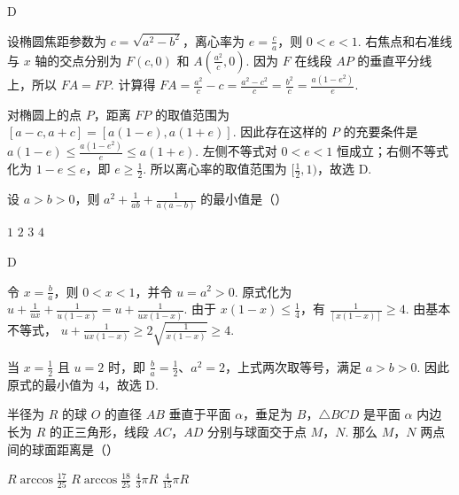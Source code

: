 \begin{answer}
D
\end{answer}

\begin{solution}
设椭圆焦距参数为 \(c=\sqrt{a^2-b^2}\)，离心率为 \(e=\frac{c}{a}\)，则 \(0<e<1\). 右焦点和右准线与 \(x\) 轴的交点分别为 \(F(c,0)\) 和 \(A(\frac{a^2}{c},0)\). 因为 \(F\) 在线段 \(AP\) 的垂直平分线上，所以 \(FA=FP\). 计算得
\(FA=\frac{a^2}{c}-c=\frac{a^2-c^2}{c}=\frac{b^2}{c}=\frac{a(1-e^2)}{e}\).

对椭圆上的点 \(P\)，距离 \(FP\) 的取值范围为 \([a-c,a+c]=[a(1-e),a(1+e)]\). 因此存在这样的 \(P\) 的充要条件是 \(a(1-e)\leq\frac{a(1-e^2)}{e}\leq a(1+e)\). 左侧不等式对 \(0<e<1\) 恒成立；右侧不等式化为 \(1-e\leq e\)，即 \(e\geq\frac{1}{2}\). 所以离心率的取值范围为 \([\frac{1}{2},1)\)，故选 D.
\end{solution}

\begin{problem}
设 \(a > b > 0\)，则 \(a^2 + \frac{1}{ab} + \frac{1}{a(a - b)}\) 的最小值是（\quad）

\choices
    {\(1\)}
    {\(2\)}
    {\(3\)}
    {\(4\)}
\end{problem}

\begin{answer}
D
\end{answer}

\begin{solution}
令 \(x=\frac{b}{a}\)，则 \(0<x<1\)，并令 \(u=a^2>0\). 原式化为 \(u+\frac{1}{ux}+\frac{1}{u(1-x)}=u+\frac{1}{ux(1-x)}\). 由于 \(x(1-x)\leq\frac{1}{4}\)，有 \(\frac{1}{[x(1-x)]}\geq4\). 由基本不等式，
\(u+\frac{1}{ux(1-x)}\geq2\sqrt{\frac{1}{x(1-x)}}\geq4\).

当 \(x=\frac{1}{2}\) 且 \(u=2\) 时，即 \(\frac{b}{a}=\frac{1}{2}\)、\(a^2=2\)，上式两次取等号，满足 \(a>b>0\). 因此原式的最小值为 \(4\)，故选 D.
\end{solution}

\begin{problem}
半径为 \(R\) 的球 \(O\) 的直径 \(AB\) 垂直于平面 \(\alpha\)，垂足为 \(B\)，\(\triangle BCD\) 是平面 \(\alpha\) 内边长为 \(R\) 的正三角形，线段 \(AC\)，\(AD\) 分别与球面交于点 \(M\)，\(N\). 那么 \(M\)，\(N\) 两点间的球面距离是（\quad）


\choices
    {\(R\arccos\frac{17}{25}\)}
    {\(R\arccos\frac{18}{25}\)}
    {\(\frac{4}{3}\pi R\)}
    {\(\frac{4}{15}\pi R\)}
\end{problem}

